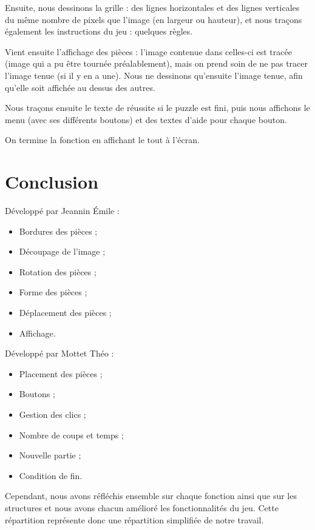 \documentclass[]{article}
\begin{document}
Ensuite, nous dessinons la grille : des lignes horizontales et des lignes verticales du même nombre de pixels que l'image (en largeur ou hauteur), et nous traçons également les instructions du jeu : quelques règles.

Vient ensuite l'affichage des pièces : l'image contenue dans celles-ci est tracée (image qui a pu être tournée préalablement), mais on prend soin de ne pas tracer l'image tenue (si il y en a une). Nous ne dessinons qu'ensuite l'image tenue, afin qu'elle soit affichée au dessus des autres.

Nous traçons ensuite le texte de réussite si le puzzle est fini, puis nous affichons le menu (avec ses différents boutons) et des textes d'aide pour chaque bouton.

On termine la fonction en affichant le tout à l'écran. 


\newpage

\section{Conclusion}

\begin{multicols}{2}

Développé par Jeannin Émile :
\begin{itemize}
\item
	Bordures des pièces ;
\item
	Découpage de l'image ;
\item
	Rotation des pièces ;
\item
	Forme des pièces ;
\item
	Déplacement des pièces ;
\item
	Affichage.
\end{itemize}

Développé par Mottet Théo :
\begin{itemize}
\item
	Placement des pièces ;
\item
	Boutons ;
\item
	Gestion des clics ;
\item
	Nombre de coups et temps ;
\item
	Nouvelle partie ;
\item
	Condition de fin.
\end{itemize}
\end{multicols}

Cependant, nous avons réfléchis ensemble sur chaque fonction ainsi que sur les structures et nous avons chacun amélioré les fonctionnalités du jeu. Cette répartition représente donc une répartition simplifiée de notre travail.

\listoffigures
\end{document}
